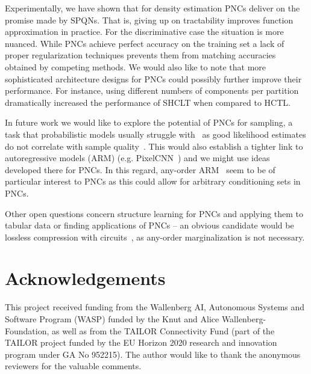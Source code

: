 \documentclass[letterpaper]{article} %
\newcommand{\eg}{e.g.\xspace}
\begin{document}
Experimentally, we have shown that for density estimation PNCs deliver on the promise made by SPQNs. That is, giving up on tractability improves function approximation in practice. For the discriminative case the situation is more nuanced. While PNCs achieve perfect accuracy on the training set a lack of proper regularization techniques prevents them from matching accuracies obtained by competing methods. We would also like to note that more sophisticated architecture designs for PNCs could possibly further improve their performance. For instance, using different numbers of components per partition dramatically increased the performance of SHCLT when compared to HCTL.



In future work we would like to explore the potential of PNCs for sampling, a task that probabilistic models usually struggle with~\citep{lang2022elevating} as good likelihood estimates do not correlate with sample quality~\citep{theis2016note}.
This would also establish a tighter link to autoregressive models (ARM) (\eg PixelCNN~\citep{van2016conditional}) and we might use ideas developed there for PNCs. In this regard, any-order ARM~\citep{uria2014deep,shih2022training} seem to be of particular interest to PNCs as this could allow for arbitrary conditioning sets in PNCs.

Other open questions concern structure learning for PNCs and applying them to tabular data or finding applications of PNCs -- an obvious candidate would be lossless compression with circuits~\citep{liu2022lossless}, as any-order marginalization is not necessary.



\section*{Acknowledgements}

This project received funding from the Wallenberg AI, Autonomous Systems and Software Program (WASP) funded by the Knut and Alice Wallenberg-Foundation, as well as from the TAILOR Connectivity Fund (part of the TAILOR project funded by the EU Horizon 2020 research and innovation program under GA No 952215).
The author would like to thank the anonymous reviewers for the valuable comments.


\end{document}
